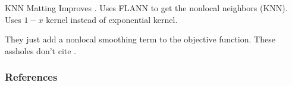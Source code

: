 \documentclass{beamer}
\begin{document}
\begin{frame}[allowframebreaks]{KNN Matting \cite{chen2012knn}}
 Improves \cite{lee2011nonlocal}.
 Uses FLANN to get the nonlocal neighbors (KNN).
 Uses $1-x$ kernel instead of exponential kernel.
\end{frame}

\begin{frame}[allowframebreaks]{\cite{chen2013image}}
 They just add a nonlocal smoothing term to the objective function.
 These assholes don't cite \cite{lee2011nonlocal}.
\end{frame}

\begin{frame}[allowframebreaks]{}
 
\end{frame}

\begin{frame}[allowframebreaks]
 \frametitle{References}
 
 
\end{frame}
\end{document}
